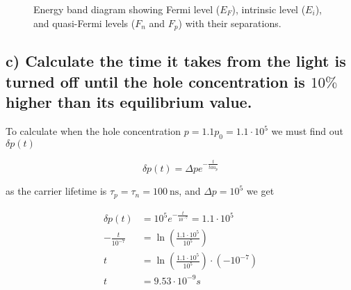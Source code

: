 \begin{figure}[H]
    \centering
    \caption{Energy band diagram showing Fermi level ($E_F$), intrinsic level ($E_i$), and quasi-Fermi levels ($F_n$ and $F_p$) with their separations.}
    \label{fig:band_diagram2}
\end{figure}

\subsection*{c) Calculate the time it takes from the light is turned off until the hole concentration is $10\%$ higher than its equilibrium value.}

To calculate when the hole concentration $p=1.1p_0=1.1\cdot 10^{5}$ we must find out $\delta p(t)$ 

\begin{equation*}
    \delta p(t)=\Delta p e^{-\frac{t}{tau_p}}
\end{equation*}

as the carrier lifetime is \( \tau_{p}=\tau_{n}=100 \mathrm{~ns} \), and $\Delta p = 10^{5}$ we get 

\begin{align*}
    \delta p(t)&=10^{5} e^{-\frac{t}{10^{-7}}}=1.1\cdot 10^{5}\\
    -\frac{t}{10^{-7}}&=\ln \left(\frac{1.1\cdot 10^{5}}{10^{5}}\right)\\
    t&=\ln \left(\frac{1.1\cdot 10^{5}}{10^{5}}\right)\cdot\left(-10^{-7}\right)\\
    t&=9.53\cdot10^{-9}s
\end{align*}


